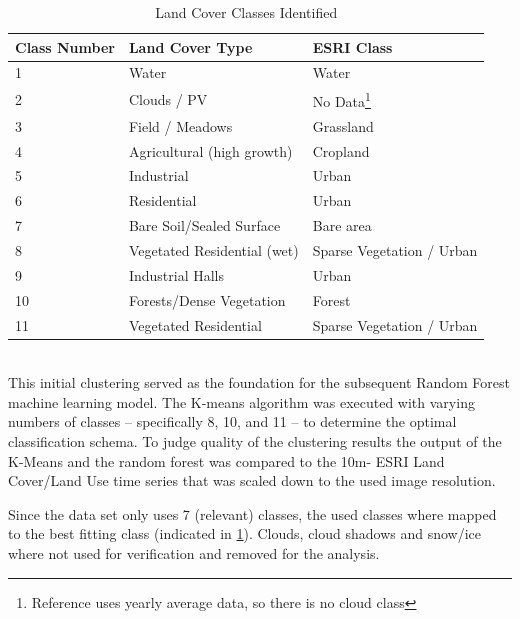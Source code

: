 \documentclass[12pt,a4paper, english,twoside]{article}
\begin{document}
        \begin{table}[ht]
          \begin{minipage}{\textwidth}
          \centering
          \renewcommand{\arraystretch}{1.4}
          \caption{Land Cover Classes Identified}\label{tab:land_cover_classes}
          \begin{tabular}{p{1cm}p{4cm}l}
            \toprule
            \textbf{Class Number} & \textbf{Land Cover Type} & \textbf{ESRI Class}\\
            \midrule
            1 &  Water  & Water \\
            2  & Clouds / PV & No Data\footnote{Reference uses yearly average data, so there is no cloud class}\\
            3  & Field / Meadows & Grassland\\ 
            4  & Agricultural (high growth) & Cropland \\
            5  & Industrial & Urban \\  
            6  & Residential & Urban \\
            7  & Bare Soil/Sealed Surface & Bare area\\ 
            8  & Vegetated Residential (wet) & Sparse Vegetation / Urban  \\ %
            9  & Industrial Halls & Urban \\ 
            10 & Forests/Dense Vegetation & Forest\\
            11 & Vegetated Residential & Sparse Vegetation / Urban \\%
            \bottomrule
        \end{tabular}
       \end{minipage}
      \end{table}
    \\
    This initial clustering served as the foundation for the subsequent Random Forest machine learning model.
      The K-means algorithm was executed with varying numbers of classes – specifically 8, 10, and 11 – to determine the optimal classification schema.
      To judge quality of the clustering results the output of the K-Means and the random forest was compared to the %
      10m- ESRI Land Cover/Land Use time series \autocite{Zhang} that was scaled down to the used image resolution. 
      
      Since the data set only uses 7 (relevant) classes, the used classes where mapped to the best fitting class (indicated in \cref{tab:land_cover_classes}). 
      Clouds, cloud shadows and snow/ice where not used for verification and removed for the analysis.\\ 
    \newpage 
\end{document}
